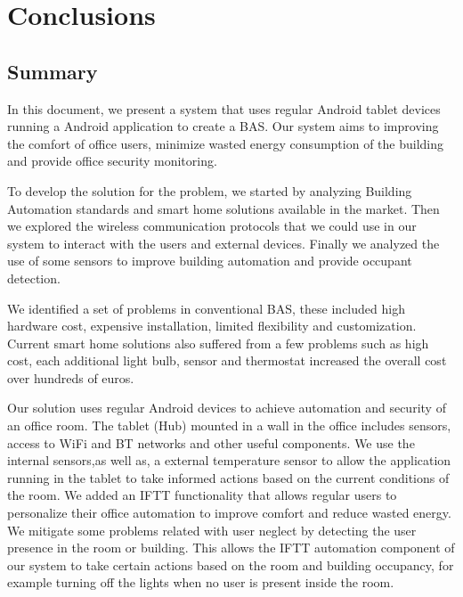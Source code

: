 \chapter{Conclusions}
\label{chapter:conclusion}

\section{Summary}
\label{section:summary}


In this document, we present a system that uses regular Android tablet devices running a Android application to create a \ac{BAS}. Our system aims to improving the comfort of office users, minimize wasted energy consumption of the building and provide office security monitoring. 

To develop the solution for the problem, we started by analyzing Building Automation standards and smart home solutions available in the market. Then we explored the wireless communication protocols that we could use in our system to interact with the users and external devices. Finally we analyzed the use of some sensors to improve building automation and provide occupant detection. 

We identified a set of problems in conventional \ac{BAS}, these included high hardware cost, expensive installation, limited flexibility and customization.
Current smart home solutions also suffered from a few problems such as high cost, each additional light bulb, sensor and thermostat increased the overall cost over hundreds of euros.

Our solution uses regular Android devices to achieve automation and security of an office room. The tablet (Hub) mounted in a wall in the office includes sensors, access to \ac{WiFi} and \ac{BT} networks and other useful components. We use the internal sensors,as well as, a external temperature sensor to allow the application running in the tablet to take informed actions based on the current conditions of the room. 
We added an \ac{IFTT} functionality that allows regular users to personalize their office automation to improve comfort and reduce wasted energy. We mitigate some problems related with user neglect by detecting the user presence in the room or building. This allows the \ac{IFTT} automation component of our system to take certain actions based on the room and building occupancy, for example turning off the lights when no user is present inside the room.


